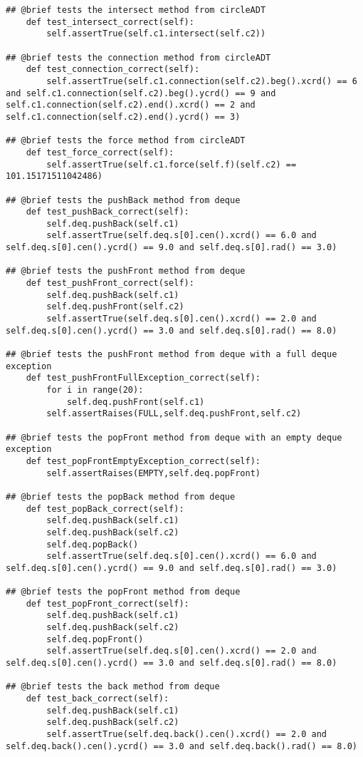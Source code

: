 \documentclass[12pt]{article}
\begin{document}
\begin{lstlisting}
## @brief tests the intersect method from circleADT
    def test_intersect_correct(self):
        self.assertTrue(self.c1.intersect(self.c2))

## @brief tests the connection method from circleADT
    def test_connection_correct(self):
        self.assertTrue(self.c1.connection(self.c2).beg().xcrd() == 6 and self.c1.connection(self.c2).beg().ycrd() == 9 and self.c1.connection(self.c2).end().xcrd() == 2 and self.c1.connection(self.c2).end().ycrd() == 3) 

## @brief tests the force method from circleADT
    def test_force_correct(self):
        self.assertTrue(self.c1.force(self.f)(self.c2) == 101.15171511042486)
        
## @brief tests the pushBack method from deque
    def test_pushBack_correct(self):
        self.deq.pushBack(self.c1)
        self.assertTrue(self.deq.s[0].cen().xcrd() == 6.0 and self.deq.s[0].cen().ycrd() == 9.0 and self.deq.s[0].rad() == 3.0)

## @brief tests the pushFront method from deque
    def test_pushFront_correct(self):
        self.deq.pushBack(self.c1)
        self.deq.pushFront(self.c2)
        self.assertTrue(self.deq.s[0].cen().xcrd() == 2.0 and self.deq.s[0].cen().ycrd() == 3.0 and self.deq.s[0].rad() == 8.0)

## @brief tests the pushFront method from deque with a full deque exception
    def test_pushFrontFullException_correct(self):
        for i in range(20):
            self.deq.pushFront(self.c1)
        self.assertRaises(FULL,self.deq.pushFront,self.c2)

## @brief tests the popFront method from deque with an empty deque exception
    def test_popFrontEmptyException_correct(self):
        self.assertRaises(EMPTY,self.deq.popFront)

## @brief tests the popBack method from deque
    def test_popBack_correct(self):
        self.deq.pushBack(self.c1)
        self.deq.pushBack(self.c2)
        self.deq.popBack()
        self.assertTrue(self.deq.s[0].cen().xcrd() == 6.0 and self.deq.s[0].cen().ycrd() == 9.0 and self.deq.s[0].rad() == 3.0)

## @brief tests the popFront method from deque
    def test_popFront_correct(self):
        self.deq.pushBack(self.c1)
        self.deq.pushBack(self.c2)
        self.deq.popFront()
        self.assertTrue(self.deq.s[0].cen().xcrd() == 2.0 and self.deq.s[0].cen().ycrd() == 3.0 and self.deq.s[0].rad() == 8.0)

## @brief tests the back method from deque
    def test_back_correct(self):
        self.deq.pushBack(self.c1)
        self.deq.pushBack(self.c2)
        self.assertTrue(self.deq.back().cen().xcrd() == 2.0 and self.deq.back().cen().ycrd() == 3.0 and self.deq.back().rad() == 8.0)


\end{lstlisting}
\end{document}
